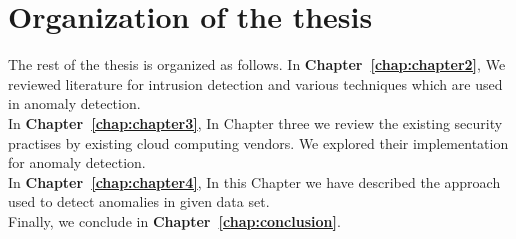 \section{Organization of the thesis}
The rest of the thesis is organized as follows.\newline
In \textbf{Chapter~\ref{chap:chapter2}}, We reviewed literature for intrusion detection and various techniques which are used in anomaly detection.\\
In \textbf{Chapter~\ref{chap:chapter3}}, In Chapter three we review the existing security practises by existing cloud computing vendors. We explored their implementation for anomaly detection.\\
In \textbf{Chapter~\ref{chap:chapter4}}, In this Chapter we have described the approach used to detect anomalies in given data set.\\
Finally, we conclude in \textbf{Chapter~\ref{chap:conclusion}}.\\







































